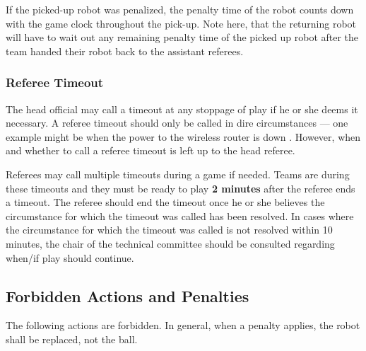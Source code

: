 If the picked-up robot was penalized, the penalty time of the robot counts down with the game clock throughout the pick-up.
Note here, that the returning robot will have to wait out any remaining penalty time of the picked up robot after the team handed their robot back to the assistant referees.

\subsubsection{Referee Timeout}
\label{sec:referee_timeout}
The head official may call a timeout at any stoppage of play if he or she deems it necessary. A referee timeout should only be called in dire circumstances --- one example might be when the power to the wireless router is down . However, when and whether to call a referee timeout is left up to the head referee.

Referees may call multiple timeouts during a game if needed. Teams are  during these timeouts and they must be ready to play \textbf{2 minutes} after the referee ends a timeout. The referee should end the timeout once he or she believes the circumstance for which the timeout was called has been resolved. In cases where the circumstance for which the timeout was called is not resolved within 10 minutes, the chair of the technical committee should be consulted regarding when/if play should continue.

\subsection{Forbidden Actions and Penalties}
\label{sec:forbidden_act}

The following actions are forbidden. In general, when a penalty applies, the robot shall be replaced, not the ball.


